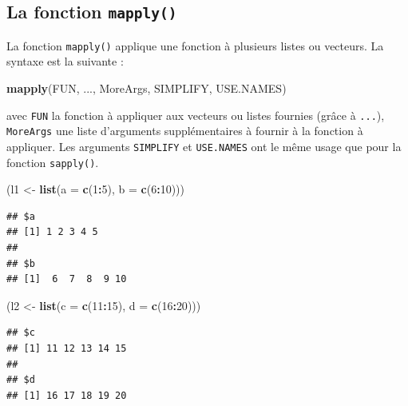 \documentclass[
  11pt,
]{book}
\newenvironment{Shaded}{\begin{snugshade}}{\end{snugshade}}
\newcommand{\DataTypeTok}[1]{\textcolor[rgb]{0.13,0.29,0.53}{#1}}
\newcommand{\DecValTok}[1]{\textcolor[rgb]{0.00,0.00,0.81}{#1}}
\newcommand{\KeywordTok}[1]{\textcolor[rgb]{0.13,0.29,0.53}{\textbf{#1}}}
\newcommand{\NormalTok}[1]{#1}
\newcommand{\OperatorTok}[1]{\textcolor[rgb]{0.81,0.36,0.00}{\textbf{#1}}}
\newcommand{\StringTok}[1]{\textcolor[rgb]{0.31,0.60,0.02}{#1}}
\numberwithin{equation}{section}
\numberwithin{countremarque}{section}
\begin{document}
\hypertarget{boucles_vectorisation_apply_mapply}{%
\subsection{\texorpdfstring{La fonction \texttt{mapply()}}{La fonction mapply()}}\label{boucles_vectorisation_apply_mapply}}

La fonction \texttt{mapply()} applique une fonction à plusieurs listes ou vecteurs. La syntaxe est la suivante :

\begin{Shaded}
\begin{Highlighting}[]
\KeywordTok{mapply}\NormalTok{(FUN, ..., MoreArgs, SIMPLIFY, USE.NAMES)}
\end{Highlighting}
\end{Shaded}

avec \texttt{FUN} la fonction à appliquer aux vecteurs ou listes fournies (grâce à \texttt{...}), \texttt{MoreArgs} une liste d'arguments supplémentaires à fournir à la fonction à appliquer. Les arguments \texttt{SIMPLIFY} et \texttt{USE.NAMES} ont le même usage que pour la fonction \texttt{sapply()}.

\begin{Shaded}
\begin{Highlighting}[]
\NormalTok{(l1 \textless{}{-}}\StringTok{ }\KeywordTok{list}\NormalTok{(}\DataTypeTok{a =} \KeywordTok{c}\NormalTok{(}\DecValTok{1}\OperatorTok{:}\DecValTok{5}\NormalTok{), }\DataTypeTok{b =} \KeywordTok{c}\NormalTok{(}\DecValTok{6}\OperatorTok{:}\DecValTok{10}\NormalTok{)))}
\end{Highlighting}
\end{Shaded}

\begin{lstlisting}
## $a
## [1] 1 2 3 4 5
## 
## $b
## [1]  6  7  8  9 10
\end{lstlisting}

\begin{Shaded}
\begin{Highlighting}[]
\NormalTok{(l2 \textless{}{-}}\StringTok{ }\KeywordTok{list}\NormalTok{(}\DataTypeTok{c =} \KeywordTok{c}\NormalTok{(}\DecValTok{11}\OperatorTok{:}\DecValTok{15}\NormalTok{), }\DataTypeTok{d =} \KeywordTok{c}\NormalTok{(}\DecValTok{16}\OperatorTok{:}\DecValTok{20}\NormalTok{)))}
\end{Highlighting}
\end{Shaded}

\begin{lstlisting}
## $c
## [1] 11 12 13 14 15
## 
## $d
## [1] 16 17 18 19 20
\end{lstlisting}
\end{document}
